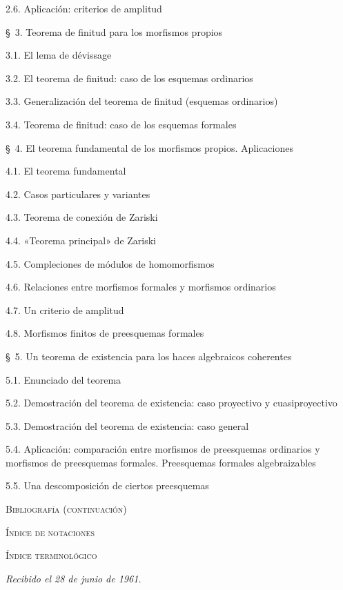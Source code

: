 \documentclass[oneside]{amsart}
\newcommand{\oldpage}[2][]{{\marginnote{\normalfont\textbf{#1}~|~#2}}\ignorespaces}
\begin{document}
\begin{flushleft}
2.6. Aplicación: criterios de amplitud 

\medskip
\S~3. Teorema de finitud para los morfismos propios 

3.1. El lema de dévissage 

3.2. El teorema de finitud: caso de los esquemas ordinarios 

3.3. Generalización del teorema de finitud (esquemas ordinarios) 

3.4. Teorema de finitud: caso de los esquemas formales 

\medskip
\S~4. El teorema fundamental de los morfismos propios. Aplicaciones 

4.1. El teorema fundamental 

4.2. Casos particulares y variantes 

4.3. Teorema de conexión de Zariski 

4.4. «Teorema principal» de Zariski 

4.5. Compleciones de módulos de homomorfismos 

4.6. Relaciones entre morfismos formales y morfismos ordinarios 

4.7. Un criterio de amplitud 

4.8. Morfismos finitos de preesquemas formales 

\oldpage[III]{167}

\S~5. Un teorema de existencia para los haces algebraicos coherentes 

5.1. Enunciado del teorema 

5.2. Demostración del teorema de existencia: caso proyectivo y cuasiproyectivo

5.3. Demostración del teorema de existencia: caso general 

5.4. Aplicación: comparación entre morfismos de preesquemas ordinarios y
morfismos de preesquemas formales. Preesquemas formales algebraizables 

5.5. Una descomposición de ciertos preesquemas 

\medskip
\textsc{Bibliografía (continuación)} 

\textsc{Índice de notaciones} 

\textsc{Índice terminológico} 

\begin{flushright}
\emph{Recibido el 28 de junio de 1961.}
\end{flushright}
\end{flushleft}
\end{document}
